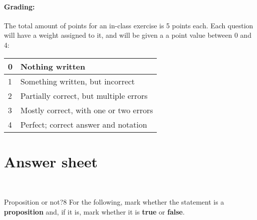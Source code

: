 \documentclass[a4paper,12pt]{book}
\begin{document}
    \paragraph{Grading:}
        The total amount of points for an in-class exercise is 5 points each.
        Each question will have a weight assigned to it, and will be given
        a a point value between 0 and 4:

    \begin{center}
        \begin{tabular}{ | l | l | }
            \hline
            0 & Nothing written \\ \hline
            1 & Something written, but incorrect \\ \hline
            2 & Partially correct, but multiple errors \\ \hline
            3 & Mostly correct, with one or two errors \\ \hline
            4 & Perfect; correct answer and notation \\ \hline

        \end{tabular}
    \end{center}



    \newpage{}
    \section*{Answer sheet}

    ~\\
    \begin{answersheetquestion}{1}{Proposition or not?}{8}
        For the following, mark whether the statement is a \textbf{proposition} and,
        if it is, mark whether it is \textbf{true} or \textbf{false}.
    \end{answersheetquestion}
\end{document}
